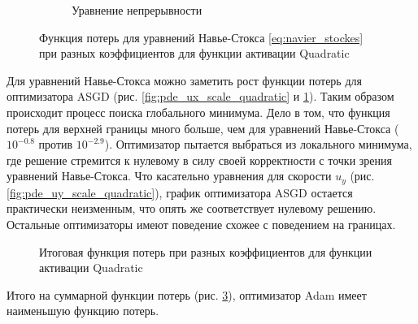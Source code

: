 \begin{figure}[htbp]
\begin{subfigure}[b]{0.7\textwidth}
        \caption{Уравнение непрерывности}
        \label{fig:pde_continuity_scale_quadratic}
    \end{subfigure}
    \caption{Функция потерь для уравнений Навье-Стокса \eqref{eq:navier_stockes} при разных коэффициентов для функции активации Quadratic}
    \label{fig:pde_loss_scale_quadratic}
\end{figure}

Для уравнений Навье-Стокса можно заметить рост функции потерь для оптимизатора
ASGD (рис. \ref{fig:pde_ux_scale_quadratic} и \ref{fig:pde_continuity_scale_quadratic}).
Таким образом происходит процесс поиска глобального минимума. Дело в том,
что функция потерь для верхней границы много больше, чем для уравнений Навье-Стокса
($10^{-0.8}$ против $10^{-2.9}$). Оптимизатор пытается выбраться из локального 
минимума, где решение стремится к нулевому в силу своей корректности с точки
зрения уравнений Навье-Стокса. Что касательно уравнения для скорости $u_y$
(рис. \ref{fig:pde_uy_scale_quadratic}), график оптимизатора ASGD остается
практически неизменным, что опять же соответствует нулевому решению.
Остальные оптимизаторы имеют поведение схожее с поведением на границах.



\begin{figure}[htbp]
    \centering
    \caption{Итоговая функция потерь при разных коэффициентов для функции активации Quadratic}
    \label{fig:total_loss_scale_quadratic}
\end{figure}

Итого на суммарной функции потерь (рис. \ref{fig:total_loss_scale_quadratic}),
оптимизатор Adam имеет наименьшую функцию потерь.